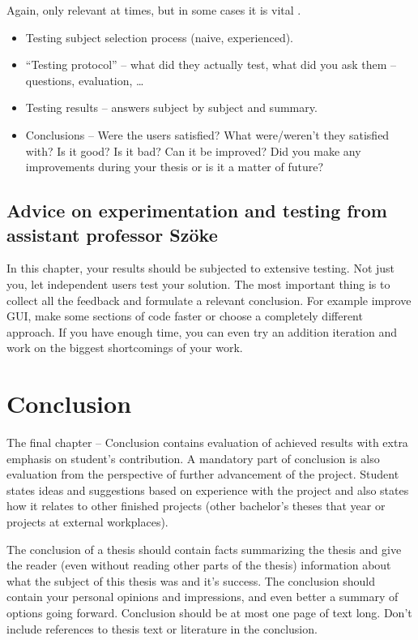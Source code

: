 {{Again, only relevant at times, but in some cases it is vital \cite{Cernocky}.
\begin{itemize}
  \item{Testing subject selection process (naive, experienced).}
  \item{``Testing protocol'' -- what did they actually test, what did you ask them -- questions, evaluation, \ldots}
  \item{Testing results -- answers subject by subject and summary.}
  \item{Conclusions -- Were the users satisfied? What were/weren't they satisfied with? Is it good? Is it bad? Can it be improved? Did you make any improvements during your thesis or is it a matter of future?}
\end{itemize}


\subsection*{Advice on experimentation and testing from assistant professor Szöke}
In this chapter, your results should be subjected to extensive testing. Not just you, let independent users test your solution. The most important thing is to collect all the feedback and formulate a relevant conclusion. For example improve GUI, make some sections of code faster or choose a completely different approach. If you have enough time, you can even try an addition iteration and work on the biggest shortcomings of your work.


\section{Conclusion}
\label{zaverPrace}

The final chapter -- Conclusion contains evaluation of achieved results with extra emphasis on student's contribution. A mandatory part of conclusion is also evaluation from the perspective of further advancement of the project. Student states ideas and suggestions based on experience with the project and also states how it relates to other finished projects (other bachelor's theses that year or projects at external workplaces).

The conclusion of a thesis should contain facts summarizing the thesis and give the reader (even without reading other parts of the thesis) information about what the subject of this thesis was and it's success. The conclusion should contain your personal opinions and impressions, and even better a summary of options going forward. Conclusion should be at most one page of text long. Don't include references to thesis text or literature in the conclusion.

}}
